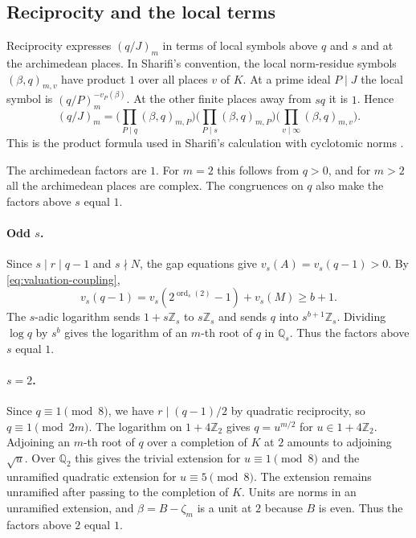 \documentclass[11pt]{article}
\begin{document}
\subsection{Reciprocity and the local terms}

Reciprocity expresses $(q/J)_m$ in terms of local symbols above
$q$ and $s$ and at the archimedean places.
In Sharifi's convention, the local norm-residue symbols
$(\beta,q)_{m,v}$ have product $1$ over all places $v$ of $K$.
At a prime ideal $P\mid J$ the local symbol is
$(q/P)_m^{-v_P(\beta)}$. At the other finite places away from
$sq$ it is $1$. Hence
\[
(q/J)_m =
\biggl(\prod_{P\mid q}(\beta,q)_{m,P}\biggr)
\biggl(\prod_{P\mid s}(\beta,q)_{m,P}\biggr)
\biggl(\prod_{v\mid\infty}(\beta,q)_{m,v}\biggr).
\]
This is the product formula used in Sharifi's calculation with
cyclotomic norms \cite[\S3, eq.~(5) and \S\S4,8]{SharifiCycl}.

The archimedean factors are $1$. For $m=2$ this follows from $q>0$,
and for $m>2$ all the archimedean places are complex. The
congruences on $q$ also make the factors above $s$ equal $1$.

\paragraph{Odd $s$.}
Since $s\mid r\mid q-1$ and $s\nmid N$, the gap equations give
$v_s(A)=v_s(q-1)>0$. By \eqref{eq:valuation-coupling},
\[
v_s(q-1)=v_s(2^{\operatorname{ord}_s(2)}-1)+v_s(M)
  \ge b+1.
\]
The $s$-adic logarithm sends $1+s\mathbb Z_s$ to $s\mathbb Z_s$
and sends $q$ into $s^{b+1}\mathbb Z_s$. Dividing $\log q$ by
$s^b$ gives the logarithm of an $m$-th root of $q$ in $\mathbb Q_s$.
Thus the factors above $s$ equal $1$.

\paragraph{$s=2$.}
Since $q\equiv1\pmod8$, we have $r\mid(q-1)/2$ by quadratic
reciprocity, so $q\equiv1\pmod{2m}$. The logarithm on
$1+4\mathbb Z_2$ gives $q=u^{m/2}$ for $u\in1+4\mathbb Z_2$.
Adjoining an $m$-th root of $q$ over a completion of $K$ at $2$
amounts to adjoining $\sqrt u$. Over $\mathbb Q_2$ this gives
the trivial extension for $u\equiv1\pmod8$ and the unramified
quadratic extension for $u\equiv5\pmod8$. The extension remains
unramified after passing to the completion of $K$. Units are
norms in an unramified extension, and $\beta=B-\zeta_m$ is a unit
at $2$ because $B$ is even. Thus the factors above $2$ equal $1$.
\end{document}

